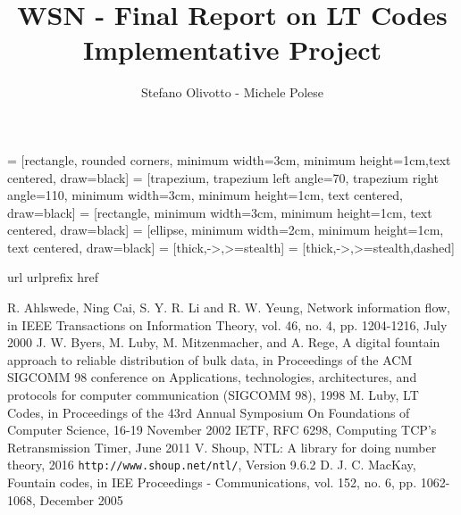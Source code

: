 \documentclass[12pt]{article}
\begin{document}
\title{WSN - Final Report on LT Codes Implementative Project}
\author{Stefano Olivotto - Michele Polese}
\maketitle

 = [rectangle, rounded corners, minimum width=3cm, minimum height=1cm,text centered, draw=black]
 = [trapezium, trapezium left angle=70, trapezium right angle=110, minimum width=3cm, minimum height=1cm, text centered, draw=black]
 = [rectangle, minimum width=3cm, minimum height=1cm, text centered, draw=black]
 = [ellipse, minimum width=2cm, minimum height=1cm, text centered, draw=black]
 = [thick,->,>=stealth]
 = [thick,->,>=stealth,dashed]








\begin{thebibliography}{10}
\expandafter\ifx\csname url\endcsname\relax
  \def\url#1{\texttt{#1}}\fi
\expandafter\ifx\csname urlprefix\endcsname\relax\def\urlprefix{URL }\fi
\expandafter\ifx\csname href\endcsname\relax
  \def\href#1#2{#2} \def\path#1{#1}\fi
  

  R. Ahlswede, Ning Cai, S. Y. R. Li and R. W. Yeung, Network information flow, in IEEE Transactions on Information Theory, vol. 46, no. 4, pp. 1204-1216, July 2000
 J. W. Byers, M. Luby, M. Mitzenmacher, and A. Rege, A digital fountain approach to reliable distribution of bulk data, in Proceedings of the ACM SIGCOMM 98 conference on Applications, technologies, architectures, and protocols for computer communication (SIGCOMM 98), 1998 
 M. Luby, LT Codes, in Proceedings of the 43rd Annual Symposium On Foundations of Computer Science, 16-19 November 2002
 IETF, RFC 6298, Computing TCP's Retransmission Timer, June 2011
 V. Shoup, NTL: A library for doing number theory, 2016 \url{http://www.shoup.net/ntl/}, Version 9.6.2
 D. J. C. MacKay, Fountain codes, in IEE Proceedings - Communications, vol. 152, no. 6, pp. 1062-1068, December 2005
\end{thebibliography}
\end{document}
